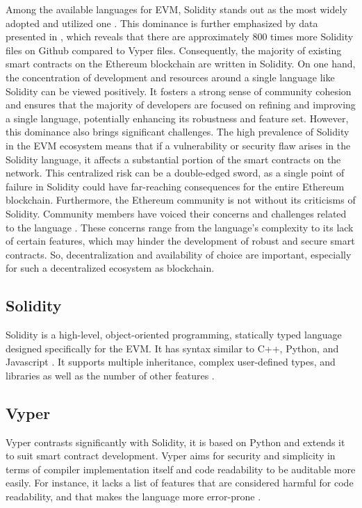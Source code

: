 Among the available languages for EVM, Solidity stands out as the most widely adopted and utilized one \cite{SolidityWidelyUsed, SolidityDevsChallenges}. This dominance is further emphasized by data presented in \cite{SolidityVyperGithubUsage}, which reveals that there are approximately 800 times more Solidity files on Github compared to Vyper files. Consequently, the majority of existing smart contracts on the Ethereum blockchain are written in Solidity. On one hand, the concentration of development and resources around a single language like Solidity can be viewed positively. It fosters a strong sense of community cohesion and ensures that the majority of developers are focused on refining and improving a single language, potentially enhancing its robustness and feature set. However, this dominance also brings significant challenges. The high prevalence of Solidity in the EVM ecosystem means that if a vulnerability or security flaw arises in the Solidity language, it affects a substantial portion of the smart contracts on the network. This centralized risk can be a double-edged sword, as a single point of failure in Solidity could have far-reaching consequences for the entire Ethereum blockchain. Furthermore, the Ethereum community is not without its criticisms of Solidity. Community members have voiced their concerns and challenges related to the language \cite{SolidityDevsChallenges}. These concerns range from the language's complexity to its lack of certain features, which may hinder the development of robust and secure smart contracts. So, decentralization and availability of choice are important, especially for such a decentralized ecosystem as blockchain.

\subsection{Solidity}

Solidity is a high-level, object-oriented programming, statically typed language designed specifically for the EVM. It has syntax similar to C++, Python, and Javascript \cite{SolidityInspirasion}. It supports multiple inheritance, complex user-defined types, and libraries as well as the number of other features \cite{SolidityFeatures}.

\subsection{Vyper}

Vyper contrasts significantly with Solidity, it is based on Python and extends it to suit smart contract development. Vyper aims for security and simplicity in terms of compiler implementation itself and code readability to be auditable more easily. For instance, it lacks a list of features that are considered harmful for code readability, and that makes the language more error-prone \cite{VyperDescription}.

